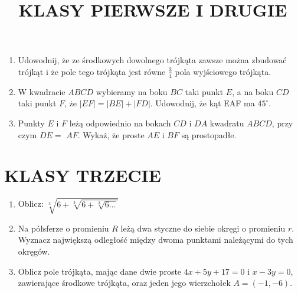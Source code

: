 \documentclass[10pt]{article}
\title{KLASY PIERWSZE I DRUGIE }
\author{}
\date{}
\begin{document}
\maketitle
\begin{enumerate}
  \item Udowodnij, że ze środkowych dowolnego trójkąta zawsze można zbudować trójkąt i że pole tego trójkąta jest równe \(\frac{3}{4}\) pola wyjściowego trójkąta.
  \item W kwadracie \(A B C D\) wybieramy na boku \(B C\) taki punkt \(E\), a na boku \(C D\) taki punkt \(F\), że \(|E F|=|B E|+|F D|\). Udowodnij, że kąt EAF ma \(45^{\circ}\).
  \item Punkty \(E\) i \(F\) leżą odpowiednio na bokach \(C D\) i \(D A\) kwadratu \(A B C D\), przy czym \(D E=\) \(A F\). Wykaż, że proste \(A E\) i \(B F\) są prostopadłe.
\end{enumerate}

\section*{KLASY TRZECIE}
\begin{enumerate}
  \item Oblicz: \(\sqrt[3]{6+\sqrt[3]{6+\sqrt[3]{6 \ldots}}}\)
  \item Na półsferze o promieniu \(R\) leżą dwa styczne do siebie okręgi o promieniu \(r\). Wyznacz największą odległość między dwoma punktami należącymi do tych okręgów.
  \item Oblicz pole trójkąta, mając dane dwie proste \(4 x+5 y+17=0\) i \(x-3 y=0\), zawierające środkowe trójkąta, oraz jeden jego wierzchołek \(A=(-1,-6)\).
\end{enumerate}
\end{document}
